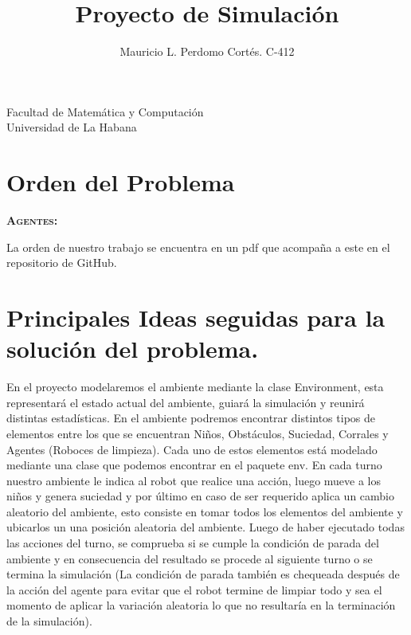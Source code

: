 \documentclass[12pt]{article}
\title{Proyecto de Simulaci\'on}
\author{Mauricio L. Perdomo Cort\'es. C-412}
\begin{document}
\vspace{8.cm}

\maketitle

\begin{center}
    Facultad de Matem\'atica y Computaci\'on\\\vspace{0.2cm} Universidad de La Habana
\end{center}

\clearpage

\newpage

\section{Orden del Problema}
\textsc{\textbf{Agentes:}}

La orden de nuestro trabajo se encuentra en un pdf que acompa\~na a este en el repositorio de GitHub.

\section{Principales Ideas seguidas para la soluci\'on del problema.}
En el proyecto modelaremos el ambiente mediante la clase Environment, esta representar\'a el estado actual del ambiente, guiar\'a la simulaci\'on y reunir\'a distintas estad\'isticas.
En el ambiente podremos encontrar distintos tipos de elementos entre los que se encuentran Ni\~nos, Obst\'aculos, Suciedad, Corrales y Agentes (Roboces de limpieza). Cada uno de estos elementos
est\'a modelado mediante una clase que podemos encontrar en el paquete env. En cada turno nuestro ambiente le indica al robot que realice una acci\'on, luego mueve a los ni\~nos y genera suciedad y por 
\'ultimo en caso de ser requerido aplica un cambio aleatorio del ambiente, esto consiste en tomar todos los elementos del ambiente y ubicarlos un una posici\'on aleatoria del ambiente. Luego de haber ejecutado todas
las acciones del turno, se comprueba si se cumple la condici\'on de parada del ambiente y en consecuencia del resultado se procede al siguiente turno o se termina la simulaci\'on (La condici\'on de parada tambi\'en es chequeada
despu\'es de la acci\'on del agente para evitar que el robot termine de limpiar todo y sea el momento de aplicar la variaci\'on aleatoria lo que no resultar\'ia en la terminaci\'on de la simulaci\'on). 
\end{document}
